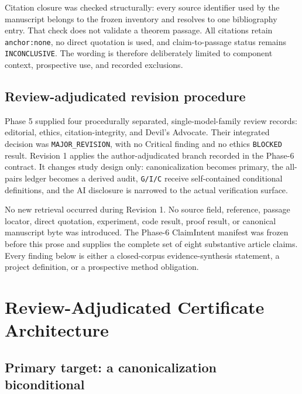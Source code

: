 \documentclass[11pt]{article}
\begin{document}
Citation closure was checked structurally: every source identifier used
by the manuscript belongs to the frozen inventory and resolves to one
bibliography entry. That check does not validate a theorem passage. All
citations retain \texttt{anchor:none}, no direct quotation is used, and
claim-to-passage status remains \texttt{INCONCLUSIVE}. The wording is
therefore deliberately limited to component context, prospective use,
and recorded exclusions.

\hypertarget{32-review-adjudicated-revision-procedure}{%
\subsection{Review-adjudicated revision
procedure}\label{32-review-adjudicated-revision-procedure}}

Phase 5 supplied four procedurally separated, single-model-family review
records: editorial, ethics, citation-integrity, and Devil's Advocate.
Their integrated decision was \texttt{MAJOR\_REVISION}, with no Critical
finding and no ethics \texttt{BLOCKED} result. Revision 1 applies the
author-adjudicated branch recorded in the Phase-6 contract. It changes
study design only: canonicalization becomes primary, the all-pairs
ledger becomes a derived audit, \texttt{G/I/C} receive self-contained
conditional definitions, and the AI disclosure is narrowed to the actual
verification surface.

No new retrieval occurred during Revision 1. No source field, reference,
passage locator, direct quotation, experiment, code result, proof
result, or canonical manuscript byte was introduced. The Phase-6
ClaimIntent manifest was frozen before this prose and supplies the
complete set of eight substantive article claims. Every finding below is
either a closed-corpus evidence-synthesis statement, a project
definition, or a prospective method obligation.

\hypertarget{4-review-adjudicated-certificate-architecture}{%
\section{Review-Adjudicated Certificate
Architecture}\label{4-review-adjudicated-certificate-architecture}}

\hypertarget{41-primary-target-a-canonicalization-biconditional}{%
\subsection{Primary target: a canonicalization
biconditional}\label{41-primary-target-a-canonicalization-biconditional}}
\end{document}
